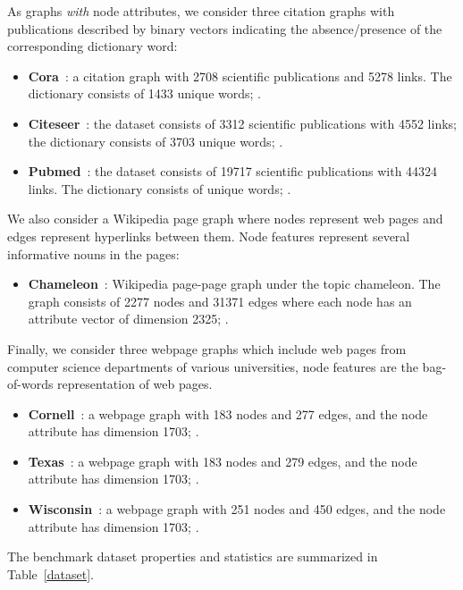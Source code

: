 \documentclass[11pt]{article}
\begin{document}
As graphs \textit{with} node attributes, we consider three citation graphs with publications described by binary vectors indicating the absence/presence of the corresponding dictionary word: 
\begin{itemize}
    \item \textbf{Cora}~\citep{mccallum2000automating}: a citation graph with 2708 scientific publications and 5278 links. The dictionary consists of 1433 unique words; .
    \item \textbf{Citeseer}~\citep{giles1998citeseer}: the dataset consists of 3312 scientific publications with 4552 links; the dictionary consists of 3703 unique words; .
    \item \textbf{Pubmed}~\citep{namata2012query}: the dataset consists of 19717 scientific publications with 44324 links. The dictionary consists of  unique words; .
\end{itemize}
We also consider a Wikipedia page graph where nodes represent web pages and edges represent hyperlinks between them. Node features represent several informative nouns in the pages:
\begin{itemize}
    \item \textbf{Chameleon}~\citep{rozemberczki2021multi}: Wikipedia page-page graph under the topic chameleon. The graph consists of 2277 nodes and 31371 edges where each node has an attribute vector of dimension 2325; .
\end{itemize}
Finally, we consider three webpage graphs which include web pages from computer science departments of various universities, node features are the bag-of-words representation of web pages. 
\begin{itemize}
    \item \textbf{Cornell}~\citep{craven1998learning}: a webpage graph with 183 nodes and 277 edges, and the node attribute has dimension 1703; .
    \item \textbf{Texas}~\citep{craven1998learning}: a webpage graph with 183 nodes and 279 edges, and the node attribute has dimension 1703; .
    \item \textbf{Wisconsin}~\citep{craven1998learning}: a webpage graph with 251 nodes and 450 edges, and the node attribute has dimension 1703; .
\end{itemize}

The benchmark dataset properties and statistics are summarized in Table~\ref{dataset}.
\end{document}
